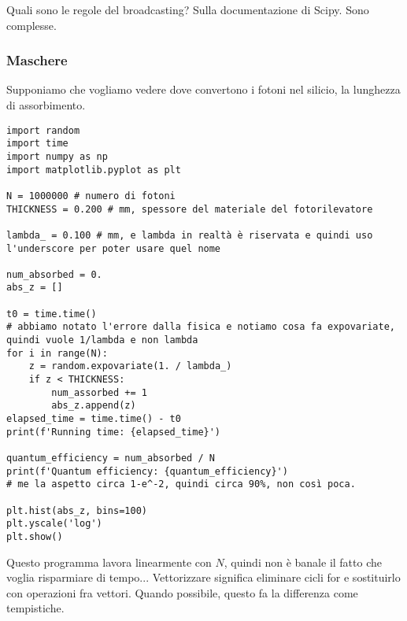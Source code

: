 \documentclass[10pt, a4paper, titlepage]{book}
\begin{document}
Quali sono le regole del broadcasting? Sulla documentazione di Scipy. Sono complesse.

\subsubsection{Maschere}

Supponiamo che vogliamo vedere dove convertono i fotoni nel silicio, la lunghezza di assorbimento.

\begin{verbatim}
import random
import time
import numpy as np
import matplotlib.pyplot as plt

N = 1000000 # numero di fotoni
THICKNESS = 0.200 # mm, spessore del materiale del fotorilevatore

lambda_ = 0.100 # mm, e lambda in realtà è riservata e quindi uso l'underscore per poter usare quel nome

num_absorbed = 0.
abs_z = []

t0 = time.time()
# abbiamo notato l'errore dalla fisica e notiamo cosa fa expovariate, quindi vuole 1/lambda e non lambda
for i in range(N):
	z = random.expovariate(1. / lambda_)
	if z < THICKNESS:
		num_assorbed += 1
		abs_z.append(z)
elapsed_time = time.time() - t0
print(f'Running time: {elapsed_time}')

quantum_efficiency = num_absorbed / N
print(f'Quantum efficiency: {quantum_efficiency}')
# me la aspetto circa 1-e^-2, quindi circa 90%, non così poca.

plt.hist(abs_z, bins=100)
plt.yscale('log')
plt.show()
\end{verbatim}

Questo programma lavora linearmente con $N$, quindi non è banale il fatto che voglia risparmiare di tempo... 
Vettorizzare significa eliminare cicli for e sostituirlo con operazioni fra vettori. Quando possibile, questo fa la differenza come tempistiche.
\end{document}
